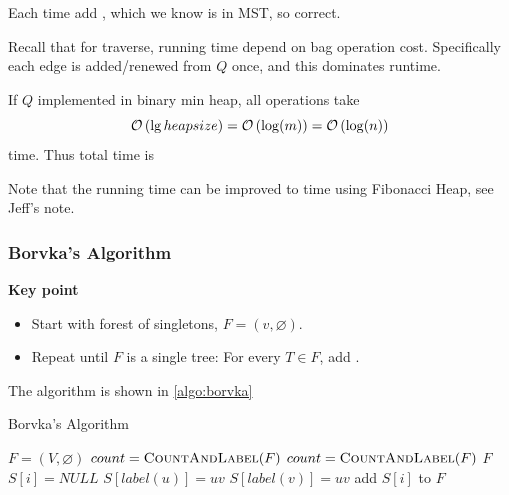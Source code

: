 \analysis

Each time add ,
which we know is in MST, so correct.

Recall that for traverse, running time depend on bag operation cost.
Specifically each edge is added/renewed from $Q$ once,
and this dominates runtime.

If $Q$ implemented in binary min heap, all operations take
\[\mathcal{O}\left(\lg{heap size}\right) = \mathcal{O}\left(\log(m)\right) = \mathcal{O}\left(\log(n)\right)\]
time. Thus total time is 

Note that the running time can be improved to
 time using Fibonacci Heap, see Jeff's note.

\subsubsection{Borvka's Algorithm}
\vspace{0.1in}\noindent\textbf{Key point}
\begin{itemize}
    \item Start with forest of singletons, $F = (v,\varnothing)$.
    \item Repeat until $F$ is a single tree:
        For every $T \in F$, add .
\end{itemize}
The algorithm is shown in \cref{algo:borvka}
\begin{algorithm}[H]
    \caption{Borvka's Algorithm}\label{algo:borvka}
    \begin{algorithmic}[1]
            \State $F = (V, \varnothing)$
            \State $count = \textsc{CountAndLabel} (F)$
                \State {}
                \State $count = \textsc{CountAndLabel} (F)$
            \EndWhile
            \Return $F$
        \EndProcedure
        \State
            \State $S[i] = NULL$ 
            \EndFor
                        \State $S[label(u)] = uv$
                    \EndIf
                        \State $S[label(v)] = uv$
                    \EndIf
                \EndIf
            \EndFor
                    \State add $S[i]$ to $F$
                \EndIf
            \EndFor
        \EndProcedure
    \end{algorithmic}
\end{algorithm}

